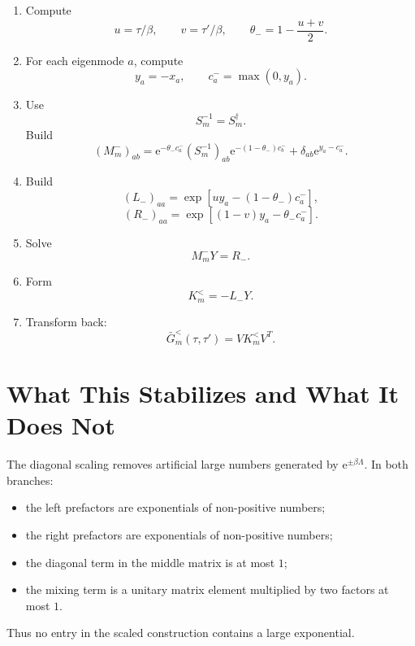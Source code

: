 \documentclass[11pt]{article}
\newcommand{\e}{\mathrm{e}}
\newcommand{\1}{\mathbb{1}}
\newcommand{\sq}[1]{\left[#1\right]}
\begin{document}
\begin{enumerate}[leftmargin=2em]
    \item Compute
    \[
        u=\tau/\beta,
        \qquad
        v=\tau'/\beta,
        \qquad
        \theta_-=1-\frac{u+v}{2}.
    \]

    \item For each eigenmode \(a\), compute
    \[
        y_a=-x_a,
        \qquad
        c_a^-=\max(0,y_a).
    \]

    \item Use
    \[
        S_m^{-1}=S_m^\dagger.
    \]
    Build
    \[
        (M_m^-)_{ab}
        =
        \e^{-\theta_- c_a^-}
        (S_m^{-1})_{ab}
        \e^{-(1-\theta_-)c_b^-}
        +
        \delta_{ab}\e^{y_a-c_a^-}.
    \]

    \item Build
    \[
        (L_-)_{aa}
        =
        \exp\sq{uy_a-(1-\theta_-)c_a^-},
    \]
    \[
        (R_-)_{aa}
        =
        \exp\sq{(1-v)y_a-\theta_-c_a^-}.
    \]

    \item Solve
    \[
        M_m^-Y=R_-.
    \]

    \item Form
    \[
        K_m^< = -L_-Y.
    \]

    \item Transform back:
    \[
        \bar G_m^<(\tau,\tau')=VK_m^<V^T.
    \]
\end{enumerate}

\section{What This Stabilizes and What It Does Not}

The diagonal scaling removes artificial large numbers generated by
\(\e^{\pm\beta\Lambda}\).  In both branches:
\begin{itemize}[leftmargin=2em]
    \item the left prefactors are exponentials of non-positive numbers;
    \item the right prefactors are exponentials of non-positive numbers;
    \item the diagonal term in the middle matrix is at most \(1\);
    \item the mixing term is a unitary matrix element multiplied by two
    factors at most \(1\).
\end{itemize}
Thus no entry in the scaled construction contains a large exponential.
\end{document}
